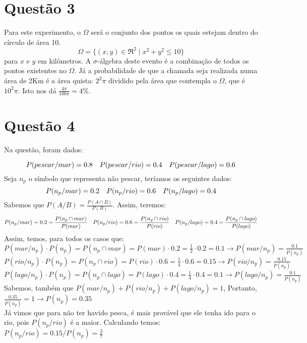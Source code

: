 \documentclass{article}
\begin{document}
\section*{Questão 3}
Para este experimento, o $\Omega$ será o conjunto dos pontos os quais estejam dentro do círculo de área 10.
\[\Omega = \{(x, y) \in \Re^2 \mid x^2 + y^2 \leq 10\}\] para $x$ e $y$ em kilômetros.
A $\sigma$-álgebra deste evento é a combinação de todos os pontos existentes no $\Omega$.
Já a probabilidade de que a chamada seja realizada numa área de 2Km é a área quista: $2^2\pi$ dividido pela área que contempla o $\Omega$, que é $10^2\pi$. Isto nos dá $\frac{4\pi}{100\pi} = 4\%$.

\section*{Questão 4}
Na questão, foram dados:

\[
    P(pescar / mar) = 0.8 \hspace*{10px}
    P(pescar / rio) = 0.4 \hspace*{10px}
    P(pescar / lago) = 0.6
\]
Seja $n_{p}$ o símbolo que representa não pescar, teríamos os seguintes dados:
\[
    P(n_{p} / mar) = 0.2 \hspace*{10px}
    P(n_{p} / rio) = 0.6 \hspace*{10px}
    P(n_{p} / lago) = 0.4
\]
Sabemos que $ P(A / B) = \frac{P(A \cap B)}{P(B)} $. Assim, teremos:
\[
    P(n_{p} / mar) = 0.2 = \frac{P(n_{p} \cap mar)}{P(mar)} \hspace*{10px}
    P(n_{p} / rio) = 0.6 = \frac{P(n_{p} \cap rio)}{P(rio)} \hspace*{10px}
    P(n_{p} / lago) = 0.4 = \frac{P(n_{p} \cap lago)}{P(lago)}
\]
Assim, temos, para todos os casos que:
\vspace{\baselineskip}\\
$P(mar / n_{p}) \cdot P(n_{p}) = P(n_{p} \cap mar) = P(mar) \cdot 0.2 = \frac{1}{2} \cdot 0.2 = 0.1 \rightarrow P(mar / n_{p}) = \frac{0.1}{P(n_{p})}$
\vspace{\baselineskip}\\
$P(rio / n_{p}) \cdot P(n_{p}) = P(n_{p} \cap rio) = P(rio) \cdot 0.6 = \frac{1}{4} \cdot 0.6 = 0.15 \rightarrow P(rio / n_{p}) = \frac{0.15}{P(n_{p})}$
\vspace{\baselineskip}\\
$P(lago / n_{p}) \cdot P(n_{p}) = P(n_{p} \cap lago) = P(lago) \cdot 0.4 = \frac{1}{4} \cdot 0.4 = 0.1 \rightarrow P(lago / n_{p}) = \frac{0.1}{P(n_{p})}$
\vspace{\baselineskip}\\
Sabemos, também que $P(mar / n_{p}) + P(rio / n_{p}) + P(lago / n_{p}) = 1$, Portanto, $\frac{0.35}{P(n_{p})} = 1 \rightarrow P(n_{p}) = 0.35$
\vspace{\baselineskip}\\
Já vimos que para não ter havido pesca, é mais provável que ele tenha ido para o rio, pois $P(n_{p} / rio)$ é a maior. Calculando temos:
\vspace{\baselineskip}\\
$P(n_{p} / rio) = 0.15 / P(n_{p}) = \frac{3}{7}$
\end{document}
